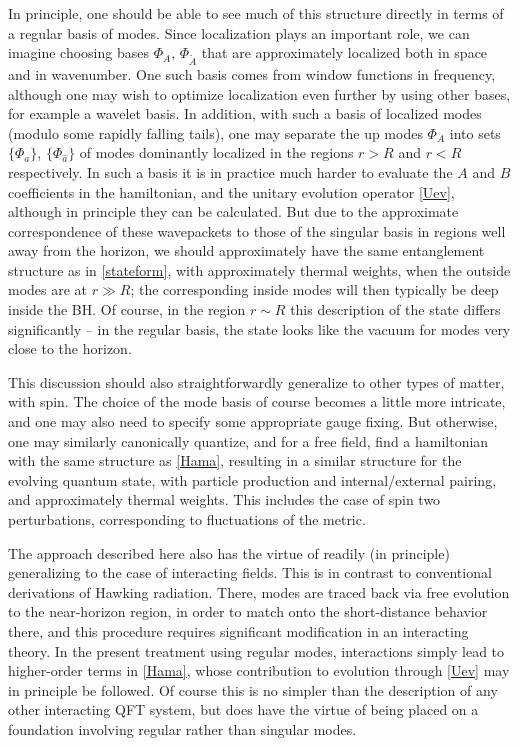\documentclass[12pt]{article}
\numberwithin{equation}{section}
\newcommand{\tA}{{\tilde A}}
\begin{document}
In principle, one should be able to see much of this structure directly in terms of a regular basis of modes.  Since localization plays an important role, we can imagine choosing bases $\Phi_A$, $\Phi_\tA$ that are approximately localized both in space and in wavenumber.  One such basis comes from window functions in frequency\cite{Hawk,GiNe}, although one may wish to optimize localization even further by using other bases, for example a wavelet basis.  In addition, with such a basis of localized modes (modulo some rapidly falling tails), one may separate the up modes $\Phi_A$ into sets $\{\Phi_a\}$, $\{\Phi_{\hat a}\}$ of modes dominantly localized in the regions $r>R$ and $r<R$ respectively.  In such a basis it is in practice much harder to evaluate the $A$ and $B$ coefficients in the hamiltonian, and the unitary evolution operator \eqref{Uev}, although in principle they can be calculated.  But due to the approximate correspondence of these wavepackets to those of the singular basis in regions well away from the horizon, we should approximately have the same entanglement structure as in \eqref{stateform}, with approximately thermal weights, when the outside modes are at $r\gg R$; the corresponding inside modes will then typically be deep inside the BH.  Of course, in the region $r\sim R$ this description of the state differs significantly -- in the regular basis, the state looks like the vacuum for modes very close to the horizon\cite{SEHS,SE2d}.

This discussion should also straightforwardly generalize to other types of matter, with spin.  The choice of the mode basis of course becomes a little more intricate, and one may also need to specify some appropriate gauge fixing.  But otherwise, one may similarly canonically quantize, and for a free field, find a hamiltonian with the same structure as \eqref{Hama}, resulting in a similar structure for the evolving quantum state, with particle production and internal/external pairing, and approximately thermal weights.  This includes the case of spin two perturbations, corresponding to fluctuations of the metric.

The approach described here also has the virtue of readily (in principle) generalizing to the case of interacting fields.  This is in contrast to conventional derivations of Hawking radiation.  There, modes are traced back via free evolution to the near-horizon region, in order to match onto the short-distance behavior there, and this procedure requires significant modification in an interacting theory.  In the present treatment using regular modes, interactions simply lead to higher-order terms in \eqref{Hama}, whose contribution to evolution through \eqref{Uev} may in principle be followed.  Of course this is no simpler than the description of any other interacting QFT system, but does have the virtue of being placed on a foundation involving regular rather than singular modes.
\end{document}
